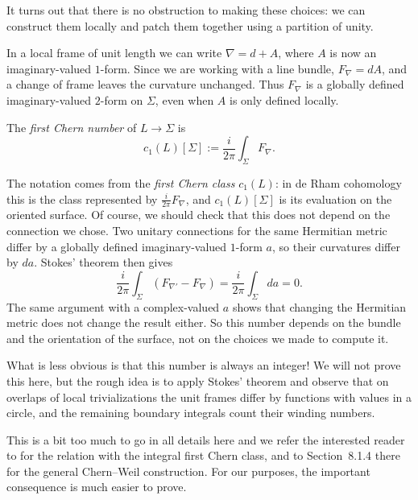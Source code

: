 It turns out that there is no obstruction to making these choices: we can construct them locally and patch them together using a partition of unity.

In a local frame of unit length we can write $\nabla=d+A$, where $A$ is now an imaginary-valued $1$-form.
Since we are working with a line bundle, $F_\nabla=dA$, and a change of frame leaves the curvature unchanged. Thus $F_\nabla$ is a globally defined imaginary-valued $2$-form on $\Sigma$, even when $A$ is only defined locally.

\begin{definition}\label{def:first-chern-number}
  The \emph{first Chern number} of $L\to\Sigma$ is
  \begin{equation}
    c_1(L)[\Sigma] := \frac{i}{2\pi}\int_\Sigma F_\nabla.
  \end{equation}
\end{definition}
The notation comes from the \emph{first Chern class} $c_1(L)$: in de Rham cohomology this is the class represented by $\frac{i}{2\pi}F_\nabla$, and $c_1(L)[\Sigma]$ is its evaluation on the oriented surface.
Of course, we should check that this does not depend on the connection we chose.
Two unitary connections for the same Hermitian metric differ by a globally defined imaginary-valued $1$-form $a$, so their curvatures differ by $da$.
Stokes' theorem then gives
\begin{equation}
  \frac{i}{2\pi}\int_\Sigma (F_{\nabla'}-F_\nabla)
  =\frac{i}{2\pi}\int_\Sigma da=0.
\end{equation}
The same argument with a complex-valued $a$ shows that changing the Hermitian metric does not change the result either.
So this number depends on the bundle and the orientation of the surface, not on the choices we made to compute it.

What is less obvious is that this number is always an integer!
We will not prove this here, but the rough idea is to apply Stokes' theorem and observe that on overlaps of local trivializations the unit frames differ by functions with values in a circle, and the remaining boundary integrals count their winding numbers.

This is a bit too much to go in all details here and we refer the interested reader to \cite[Section~8.2.2, especially Remark~8.2.2]{book:nicolaescu} for the relation with the integral first Chern class, and to Section~8.1.4 there for the general Chern--Weil construction.
For our purposes, the important consequence is much easier to prove.

